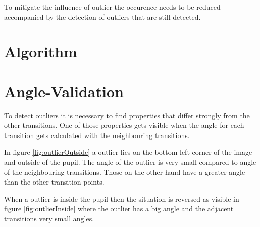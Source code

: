 To mitigate the influence of outlier the occurence needs to be reduced accompanied by the detection of outliers that are still detected.
\section{Algorithm}
\section{Angle-Validation}
\label{sec:angleValidation}
To detect outliers it is necessary to find properties that differ strongly from the other transitions. One of those properties gets visible when the angle for each transition gets calculated with the neighbouring transitions. 

In figure \ref{fig:outlierOutside} a outlier lies on the bottom left corner of the image and outside of the pupil. The angle of the outlier is very small compared to angle of the neighbouring transitions. Those on the other hand have a greater angle than the other transition points. 

When a outlier is inside the pupil then the situation is reversed as visible in figure \ref{fig:outlierInside} where the outlier has a big angle and the adjacent transitions very small angles. 

